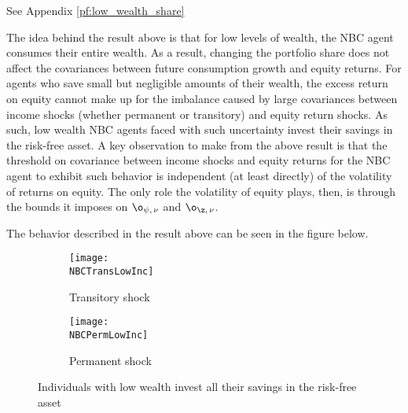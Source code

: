 \pf See Appendix \ref{pf:low_wealth_share}

The idea behind the result above is that for low levels of wealth, the NBC agent consumes their entire wealth. As a result, changing the portfolio share does not affect the covariances between future consumption growth and equity returns. For agents who save small but negligible amounts of their wealth, the excess return on equity cannot make up for the imbalance caused by large covariances between income shocks (whether permanent or transitory) and equity return shocks. As such, low wealth NBC agents faced with such uncertainty invest their savings in the risk-free asset. A key observation to make from the above result is that the threshold on covariance between income shocks and equity returns for the NBC agent to exhibit such behavior is independent (at least directly) of the volatility of returns on equity. The only role the volatility of equity plays, then, is through the bounds it imposes on $\o_{\psi,\,\nu}$ and $\o_{\z,\,\nu}$.

The behavior described in the result above can be seen in the figure below.

\begin{figure}[h]
    \centering
    \begin{subfigure}{0.49\textwidth}
        \centering
        \texttt{[image: \\NBCTransLowInc]}
        \caption{Transitory shock}
        \label{subfig:correlated_poor_transitory}        
    \end{subfigure}
    \begin{subfigure}{0.49\textwidth}
        \centering
        \texttt{[image: \\NBCPermLowInc]}
        \caption{Permanent shock}
        \label{subfig:correlated_poor_permanent}
    \end{subfigure}
    \caption{Individuals with low wealth invest all their savings in the risk-free asset}
    \label{fig:baseline_correlated_poor}
\end{figure}

